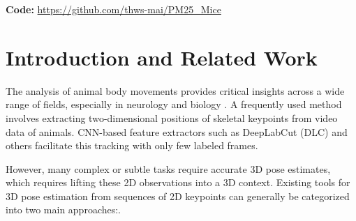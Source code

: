 \documentclass[sigconf, nonacm]{acmart}
\begin{document}
\maketitle

\vspace{-0.5em}
\textbf{Code:} \url{https://github.com/thws-mai/PM25_Mice}

\section{Introduction and Related Work}
\label{sec:intro}
The analysis of animal body movements provides critical insights across a wide range of fields, especially in neurology \cite{spasojevic2015vision} and biology \cite{an1984kinematic,lu2012biomechanics}. 
A frequently used method involves extracting two-dimensional positions of skeletal keypoints from video data of animals. CNN-based feature extractors such as DeepLabCut (DLC) \cite{mathis2018deeplabcut} and others\cite{pereira2019fast, pereira2022sleap,graving2019deepposekit,cao2019openpose,machado2015quantitative} facilitate this tracking with only few labeled frames. \par
However, many complex or subtle tasks require accurate 3D pose estimates, which requires lifting these 2D observations into a 3D context. Existing tools for 3D pose estimation from sequences of 2D keypoints can generally be categorized into two main approaches:. 
\end{document}
